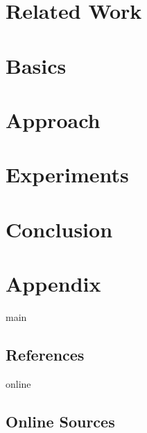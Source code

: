 \documentclass[11pt,a4paper]{report}
\begin{document}
    \chapter{Related Work}
    \label{ch:2_related_work}
    


    \chapter{Basics}
    \label{ch:3_basics}
    


    \chapter{Approach}
    \label{ch:4_approach}
    


    \chapter{Experiments}
    \label{ch:5_experiments}
    


    \chapter{Conclusion}
    \label{ch:6_conclusion}
    


    \chapter{Appendix}
    \label{ch:a_appendix}
    

    \newpage

    

    \begin{btSect}{main}
        \section*{References}
        \btPrintCited
    \end{btSect}

    \begin{btSect}{online}
        \section*{Online Sources}
        \btPrintCited
    \end{btSect}
\end{document}
